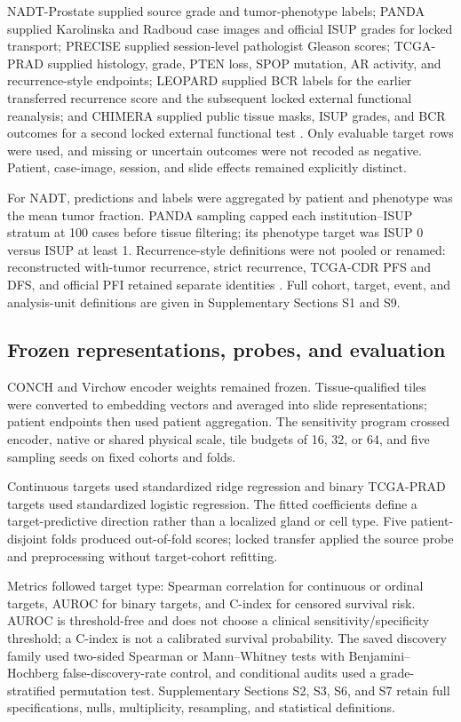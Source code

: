NADT-Prostate supplied source grade and tumor-phenotype labels; PANDA supplied Karolinska
and Radboud case images and official ISUP grades for locked transport; PRECISE supplied
session-level pathologist Gleason scores; TCGA-PRAD supplied histology, grade, PTEN loss,
SPOP mutation, AR activity, and recurrence-style endpoints; LEOPARD supplied BCR labels for the
earlier transferred recurrence score and the subsequent locked external functional reanalysis;
and CHIMERA supplied public tissue masks, ISUP grades, and BCR outcomes for a second locked
external functional test \cite{nadt2021,panda2022,precise2026,leopard2026,grisi2026}.
Only evaluable target rows were used, and missing or uncertain outcomes were not recoded as
negative. Patient, case-image, session, and slide effects remained explicitly distinct.

For NADT, predictions and labels were aggregated by patient and phenotype was the mean
tumor fraction. PANDA sampling capped each institution--ISUP stratum at 100 cases before
tissue filtering; its phenotype target was ISUP 0 versus ISUP at least 1. Recurrence-style
definitions were not pooled or renamed: reconstructed with-tumor recurrence, strict
recurrence, TCGA-CDR PFS and DFS, and official PFI retained separate identities
\cite{tcgacdr2018}. Full cohort, target, event, and analysis-unit definitions are given in
Supplementary Sections S1 and S9.

\subsection{Frozen representations, probes, and evaluation}

CONCH and Virchow encoder weights remained frozen. Tissue-qualified tiles were converted to
embedding vectors and averaged into slide representations; patient endpoints then used
patient aggregation. The sensitivity program crossed encoder, native or shared physical
scale, tile budgets of 16, 32, or 64, and five sampling seeds on fixed cohorts and folds.

Continuous targets used standardized ridge regression and binary TCGA-PRAD targets used
standardized logistic regression. The fitted coefficients define a target-predictive direction
rather than a localized gland or cell type. Five patient-disjoint folds produced out-of-fold
scores; locked transfer applied the source probe and preprocessing without target-cohort
refitting.

Metrics followed target type: Spearman correlation for continuous or ordinal targets, AUROC
for binary targets, and C-index for censored survival risk. AUROC is threshold-free and does
not choose a clinical sensitivity/specificity threshold; a C-index is not a calibrated survival
probability. The saved discovery family used two-sided Spearman or Mann--Whitney tests with
Benjamini--Hochberg false-discovery-rate control, and conditional audits used a grade-stratified
permutation test. Supplementary Sections S2, S3, S6, and S7 retain full specifications, nulls,
multiplicity, resampling, and statistical definitions.

